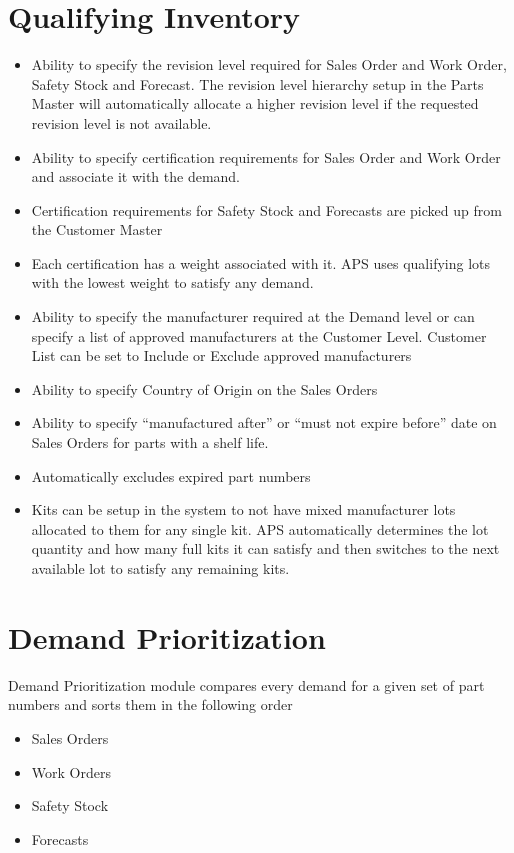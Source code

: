 \section{Qualifying Inventory}
\begin{itemize}
\item Ability to specify the revision level required for Sales Order and Work Order, Safety Stock and Forecast. The revision level hierarchy setup in the Parts Master will automatically allocate a higher revision level if the requested revision level is not available.

\item Ability to specify certification requirements for Sales Order and Work Order and associate it with the demand.

\item Certification requirements for Safety Stock and Forecasts are picked up from the Customer Master

\item Each certification has a weight associated with it. APS uses qualifying lots with the lowest weight to satisfy any demand. 

\item Ability to specify the manufacturer required at the Demand level or can specify a list of approved manufacturers at the Customer Level. Customer List can be set to Include or Exclude approved manufacturers

\item Ability to specify Country of Origin on the Sales Orders

\item Ability to specify “manufactured after” or “must not expire before” date on Sales Orders for parts with a shelf life.

\item Automatically excludes expired part numbers

\item Kits can be setup in the system to not have mixed manufacturer lots allocated to them for any single kit. APS automatically determines the lot quantity and how many full kits it can satisfy and then switches to the next available lot to satisfy any remaining kits.
\end{itemize}
\section{Demand Prioritization}
Demand Prioritization module compares every demand for a given set of part numbers and sorts them in the following order
\begin{itemize}
\item Sales Orders
\item Work Orders
\item Safety Stock
\item Forecasts
\end{itemize}
